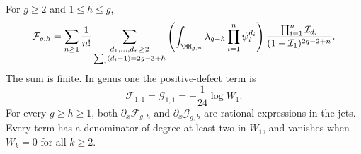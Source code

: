 \begin{lmm}\label{lmm:s07:finite-jets}
For $g\geq2$ and $1\leq h\leq g$,
\begin{equation}\label{eq:s07:finite-jets}
 \mathcal F_{g,h}
 =\sum_{n\geq1}\frac1{n!}
   \sum_{\substack{d_1,\ldots,d_n\geq2\\
                   \sum_i(d_i-1)=2g-3+h}}
   \left(\int_{\MM_{g,n}}\lambda_{g-h}
                                  \prod_{i=1}^n\psi_i^{d_i}\right)
   \frac{\prod_{i=1}^n\mathcal I_{d_i}}
        {(1-\mathcal I_1)^{2g-2+n}}.
\end{equation}
The sum is finite. In genus one the positive-defect term is
\begin{equation}\label{eq:s07:genus-one-seed}
 \mathcal F_{1,1}=\mathcal G_{1,1}
                         =-\frac1{24}\log W_1.
\end{equation}
For every $g\geq h\geq1$, both
$\partial_x\mathcal F_{g,h}$ and
$\partial_x\mathcal G_{g,h}$ are rational expressions in the jets.
Every term has a denominator of degree at least two in $W_1$, and
vanishes when $W_k=0$ for all $k\geq2$.
\end{lmm}
